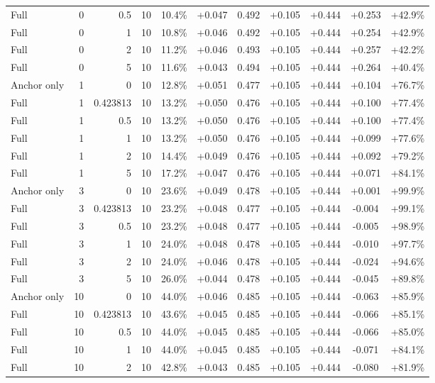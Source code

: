 \begin{table}[htbp]
\begin{tabular}{lrrrccccccc}
Full & 0 & 0.5 & 10 & 10.4\% & +0.047 & 0.492 & +0.105 & +0.444 & +0.253 & +42.9\% \\
Full & 0 & 1 & 10 & 10.8\% & +0.046 & 0.492 & +0.105 & +0.444 & +0.254 & +42.9\% \\
Full & 0 & 2 & 10 & 11.2\% & +0.046 & 0.493 & +0.105 & +0.444 & +0.257 & +42.2\% \\
Full & 0 & 5 & 10 & 11.6\% & +0.043 & 0.494 & +0.105 & +0.444 & +0.264 & +40.4\% \\
Anchor only & 1 & 0 & 10 & 12.8\% & +0.051 & 0.477 & +0.105 & +0.444 & +0.104 & +76.7\% \\
Full & 1 & 0.423813 & 10 & 13.2\% & +0.050 & 0.476 & +0.105 & +0.444 & +0.100 & +77.4\% \\
Full & 1 & 0.5 & 10 & 13.2\% & +0.050 & 0.476 & +0.105 & +0.444 & +0.100 & +77.4\% \\
Full & 1 & 1 & 10 & 13.2\% & +0.050 & 0.476 & +0.105 & +0.444 & +0.099 & +77.6\% \\
Full & 1 & 2 & 10 & 14.4\% & +0.049 & 0.476 & +0.105 & +0.444 & +0.092 & +79.2\% \\
Full & 1 & 5 & 10 & 17.2\% & +0.047 & 0.476 & +0.105 & +0.444 & +0.071 & +84.1\% \\
Anchor only & 3 & 0 & 10 & 23.6\% & +0.049 & 0.478 & +0.105 & +0.444 & +0.001 & +99.9\% \\
Full & 3 & 0.423813 & 10 & 23.2\% & +0.048 & 0.477 & +0.105 & +0.444 & -0.004 & +99.1\% \\
Full & 3 & 0.5 & 10 & 23.2\% & +0.048 & 0.477 & +0.105 & +0.444 & -0.005 & +98.9\% \\
Full & 3 & 1 & 10 & 24.0\% & +0.048 & 0.478 & +0.105 & +0.444 & -0.010 & +97.7\% \\
Full & 3 & 2 & 10 & 24.0\% & +0.046 & 0.478 & +0.105 & +0.444 & -0.024 & +94.6\% \\
Full & 3 & 5 & 10 & 26.0\% & +0.044 & 0.478 & +0.105 & +0.444 & -0.045 & +89.8\% \\
Anchor only & 10 & 0 & 10 & 44.0\% & +0.046 & 0.485 & +0.105 & +0.444 & -0.063 & +85.9\% \\
Full & 10 & 0.423813 & 10 & 43.6\% & +0.045 & 0.485 & +0.105 & +0.444 & -0.066 & +85.1\% \\
Full & 10 & 0.5 & 10 & 44.0\% & +0.045 & 0.485 & +0.105 & +0.444 & -0.066 & +85.0\% \\
Full & 10 & 1 & 10 & 44.0\% & +0.045 & 0.485 & +0.105 & +0.444 & -0.071 & +84.1\% \\
Full & 10 & 2 & 10 & 42.8\% & +0.043 & 0.485 & +0.105 & +0.444 & -0.080 & +81.9\% \\

\end{tabular}
\end{table}

